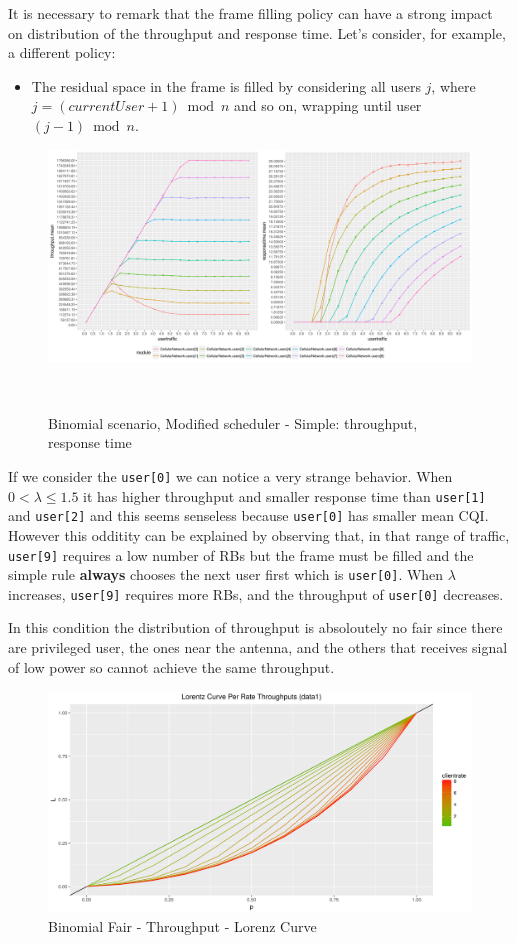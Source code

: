 It is necessary to remark that the frame filling policy can have a strong impact on distribution of the throughput and response time. Let's consider, for example, a different policy: 
\begin{itemize}
\item The residual space in the frame is filled by considering all users \(j\), where \(j = (currentUser+1) \bmod n\) and so on, wrapping until user \((j-1) \bmod n\).
\end{itemize}
\begin{figure}[H]
  \includegraphics[width=1\textwidth]{images/binom_old}
  \caption{Binomial scenario, Modified scheduler - Simple: throughput, response time}\
  \label{fig:Binomial scenario - Simple: throughput, response time}
\end{figure}
If we consider the \texttt{user[0]} we can notice a very strange behavior. When \(0 < \lambda \leq 1.5\) it has higher throughput and smaller response time than \texttt{user[1]} and \texttt{user[2]} and this seems senseless because \texttt{user[0]} has smaller mean CQI. However this odditity can be explained by observing that, in that range of traffic, \texttt{user[9]} requires a low number of RBs but the frame must be filled and the simple rule \textbf{always} chooses the next user first which is \texttt{user[0]}. When \(\lambda\) increases, \texttt{user[9]} requires more RBs, and the throughput of \texttt{user[0]} decreases.

In this condition the distribution of throughput is absoloutely no fair since there are privileged user, the ones near the antenna, and the others that receives signal of low power so cannot achieve the same throughput.
\begin{figure}[H]
  \includegraphics[width=1\textwidth]{images/lorallth-binombest.png}
  \caption{Binomial Fair - Throughput - Lorenz Curve}
  \label{fig:lorallth-binombest}
\end{figure}

